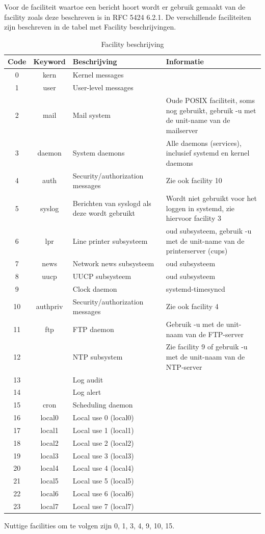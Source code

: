 Voor de faciliteit waartoe een bericht hoort wordt er gebruik gemaakt van de facility zoals deze beschreven is in RFC 5424 6.2.1. De verschillende faciliteiten zijn beschreven in de tabel met Facility beschrijvingen.

\begin{flushleft}
\begin{table}[h!]
\centering
\begin{tabularx}{\textwidth}{ |c|c|X|X| }
\hline
	Code &
	Keyword &
	Beschrijving &
	Informatie \\
\hline
0 & kern & Kernel messages & \\
\hline
1 & user & User-level messages & \\
\hline
2 & mail & Mail system & Oude POSIX faciliteit, soms nog gebruikt, gebruik -u met de unit-name van de mailserver \\
\hline
3 & daemon & System daemons & Alle daemons (services), inclusief systemd en kernel daemons \\
\hline
4 & auth & Security/authorization messages & Zie ook facility 10 \\
\hline
5 & syslog & Berichten van syslogd als deze wordt gebruikt & Wordt niet gebruikt voor het loggen in systemd, zie hiervoor facility 3 \\
\hline
6 & lpr & Line printer subsysteem & oud subsysteem, gebruik -u met de unit-name van de printerserver (cups) \\
\hline
7 & news & Network news subsysteem & oud subsysteem \\
\hline
8 & uucp & UUCP subsysteem & oud subsysteem \\
\hline
9 &      & Clock daemon & systemd-timesyncd \\
\hline
10 & authpriv & Security/authorization messages & Zie ook facility 4 \\
\hline
11 & ftp & FTP daemon & Gebruik -u met de unit-naam van de FTP-server \\
\hline
12 &     & NTP subsystem & Zie facility 9 of gebruik -u met de unit-naam van de NTP-server \\
\hline
13 &     & Log audit & \\
\hline
14 &     & Log alert & \\
\hline
15 & cron & Scheduling daemon & \\
\hline
16 & local0 & Local use 0 (local0) & \\
\hline
17 & local1 & Local use 1 (local1) & \\
\hline
18 & local2 & Local use 2 (local2) & \\
\hline
19 & local3 & Local use 3 (local3) & \\
\hline
20 & local4 & Local use 4 (local4) & \\
\hline
21 & local5 & Local use 5 (local5) & \\
\hline
22 & local6 & Local use 6 (local6) & \\
\hline
23 & local7 & Local use 7 (local7) & \\
\hline
\end{tabularx}
\caption{Facility beschrijving}
\label{table:facility}
\end{table}
\end{flushleft}


Nuttige facilities om te volgen zijn 0, 1, 3, 4, 9, 10, 15.

